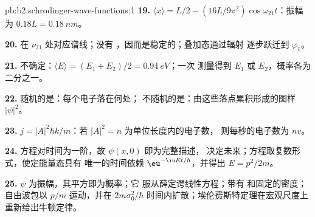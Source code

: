 \begin{solution}{pb:b2:schrodinger-wave-functions:1}
\textbf{19.} $\langle x\rangle = L/2 - (16L/9\pi^2)\cos\omega_{21}t$：振幅
为 $0.18L = \qty{0.18}{nm}$。

\textbf{20.} 在 $\nu_{21}$ 处对应谱线；没有
，因而是稳定的；叠加态通过辐射
逐步跃迁到 $\varphi_1$。

\textbf{21.} 不确定：$\langle E\rangle = (E_1 + E_2)/2 = \qty{0.94}{eV}$；一次
测量得到 $E_1$ 或 $E_2$，概率各为二分之一。

\textbf{22.} 随机的是：每个电子落在何处；
不随机的是：由这些落点累积形成的图样 $|\psi|^2$。

\textbf{23.} $j = |A|^2\hbar k/m$：若 $|A|^2 = n$ 为单位长度内的电子数，
则每秒的电子数为 $nv$。

\textbf{24.} 方程对时间为一阶，故 $\psi(x,0)$ 即为完整描述，
决定未来；方程取复数形式，使定能量态具有
唯一的时间依赖 $\eu^{-\iu Et/\hbar}$，并得出 $E = p^2/2m$。

\textbf{25.} $\psi$ 为振幅，其平方即为概率；它
服从薛定谔线性方程；带有
和固定的密度；自由波包以 $p/m$ 运动，并在
$2m\sigma_0^2/\hbar$ 时间内扩散；埃伦费斯特定理在宏观尺度上重新给出牛顿定律。
\end{solution}

